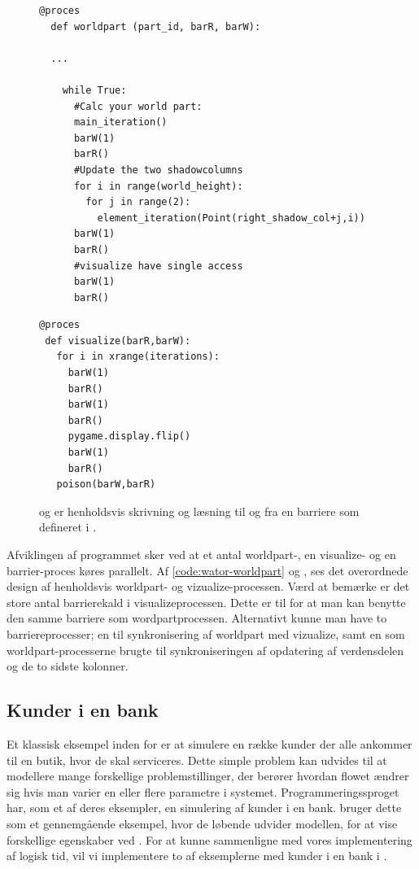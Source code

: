 \begin{figure}[hbtp]
\begin{minipage}{\linewidth}
\begin{lstlisting}[label=code:wator-worldpart,caption=Uddrag af processen 
  \code{worldpart} i Wator]
  @proces
  def worldpart (part_id, barR, barW):
  
  ...
  
    while True:
      #Calc your world part:
      main_iteration()
      barW(1)
      barR()
      #Update the two shadowcolumns
      for i in range(world_height):
        for j in range(2):
          element_iteration(Point(right_shadow_col+j,i))
      barW(1)
      barR()
      #visualize have single access
      barW(1)
      barR()
\end{lstlisting}

\begin{lstlisting}[label=code:wator-visualize,caption=Processen 
  \emph{visualize} i Wator]
@proces
 def visualize(barR,barW):
   for i in xrange(iterations):
     barW(1)
     barR()
     barW(1)
     barR()
     pygame.display.flip()
     barW(1)
     barR()
   poison(barW,barR)
\end{lstlisting}

\end{minipage}
\caption[test]{ og  er henholdsvis skrivning og læsning til og 
fra en barriere som defineret i .}
\end{figure}
Afviklingen af programmet sker ved at et antal worldpart-, en 
visualize- og en barrier-proces køres parallelt. Af 
\autoref{code:wator-worldpart} og \pageref{code:wator-visualize}, ses det 
overordnede design af henholdsvis worldpart- og 
vizualize-processen.  Værd at bemærke er det store antal barrierekald i 
visualizeprocessen. Dette er til for at man kan benytte den samme barriere som 
wordpartprocessen. Alternativt kunne man have to barriereprocesser; en til 
synkronisering af worldpart med vizualize, samt en som 
worldpart-processerne brugte til synkroniseringen af opdatering af 
verdensdelen og de to sidste kolonner. 



\subsection{Kunder i en bank}\label{bank-eksempel}
Et klassisk eksempel inden for \des er at simulere  en række kunder der alle 
ankommer til en butik, hvor de skal serviceres. Dette simple problem kan 
udvides til at modellere mange forskellige problemstillinger, der berører 
hvordan flowet ændrer sig hvis man varier en eller flere parametre
i systemet. Programmeringssproget \simpy{}har, som et af deres 
eksempler, en simulering af kunder i en bank. \simpy bruger dette som et 
gennemgående eksempel, hvor de løbende udvider modellen, for at vise 
forskellige egenskaber ved \simpy. For at kunne sammenligne \simpy  med vores 
implementering af logisk tid, vil vi implementere to af eksemplerne med kunder 
i en bank i \pycsp.

